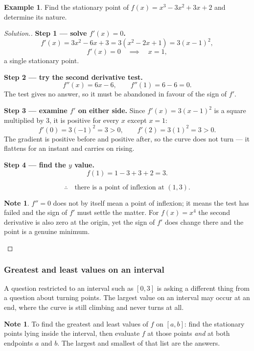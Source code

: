 \documentclass[11pt,a4paper]{article}
\theoremstyle{definition}
\newtheorem{example}[thm]{Example}
\newtheorem{note}[thm]{Note}
\newenvironment{solution}
  {\renewcommand{\qedsymbol}{}\begin{proof}[\textit{Solution}.]}
  {\end{proof}}
\begin{document}
\begin{example}
Find the stationary point of $f(x)=x^3-3x^2+3x+2$ and determine its nature.
\end{example}

\begin{solution}
\textbf{Step 1 --- solve $f'(x)=0$.}
$$f'(x)=3x^2-6x+3=3\left(x^2-2x+1\right)=3(x-1)^2,$$
$$f'(x)=0\quad\implies\quad x=1,$$
a single stationary point.

\textbf{Step 2 --- try the second derivative test.}
$$f''(x)=6x-6,\qquad f''(1)=6-6=0.$$
The test gives no answer, so it must be abandoned in favour of the sign of $f'$.

\textbf{Step 3 --- examine $f'$ on either side.} Since $f'(x)=3(x-1)^2$ is a square
multiplied by $3$, it is positive for every $x$ except $x=1$:
$$f'(0)=3(-1)^2=3>0,\qquad f'(2)=3(1)^2=3>0.$$
The gradient is positive before and positive after, so the curve does not turn --- it
flattens for an instant and carries on rising.

\textbf{Step 4 --- find the $y$ value.}
$$f(1)=1-3+3+2=3.$$

$$\therefore\quad \text{there is a point of inflexion at } (1,3).$$

\begin{note}
$f''=0$ does not by itself mean a point of inflexion; it means the test has failed and
the sign of $f'$ must settle the matter. For $f(x)=x^4$ the second derivative is also
zero at the origin, yet the sign of $f'$ does change there and the point is a genuine
minimum.
\end{note}
\end{solution}

\subsubsection{Greatest and least values on an interval}

A question restricted to an interval such as $[0,3]$ is asking a different thing from a
question about turning points. The largest value on an interval may occur at an end,
where the curve is still climbing and never turns at all.

\begin{note}
To find the greatest and least values of $f$ on $[a,b]$: find the stationary points
lying inside the interval, then evaluate $f$ at those points \emph{and} at both
endpoints $a$ and $b$. The largest and smallest of that list are the answers.
\end{note}
\end{document}
